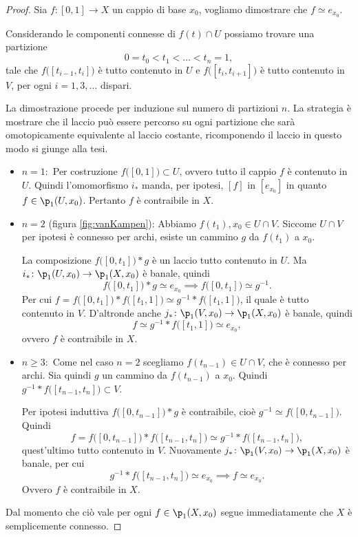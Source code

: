 \begin{proof}
	Sia \(f\colon [0,1] \to X\) un cappio di base \(x_0\), vogliamo dimostrare che \(f \simeq e_{x_0}\).

	Considerando le componenti connesse di \(f(t) \cap U\) possiamo trovare una partizione
	\[
		0 = t_0 < t_1 < \ldots < t_n=1,
	\]
	tale che \(f\big([t_{i-1},t_i]\big)\) è tutto contenuto in \(U\) e \(f\big([t_i,t_{i+1}]\big)\) è tutto contenuto in \(V\), per ogni \(i=1,3,\ldots\) dispari.

	La dimostrazione procede per induzione sul numero di partizioni \(n\).
	La strategia è mostrare che il laccio può essere percorso su ogni partizione che sarà omotopicamente equivalente al laccio costante, ricomponendo il laccio in questo modo si giunge alla tesi.
	\begin{itemize}
		\item \(n=1:\) Per costruzione \(f\big([0,1]\big)\subset U\), ovvero tutto il cappio \(f\) è contenuto in \(U\).
		      Quindi l'omomorfismo \(i_*\) manda, per ipotesi, \([f]\) in \([e_{x_0}]\) in quanto \(f\in \p_1(U,x_0)\).
		      Pertanto \(f\) è contraibile in \(X\).
		\item \(n=2\) (figura \ref{fig:vanKampen}): Abbiamo \(f(t_1),x_0\in U \cap V\).
		      Siccome \(U\cap V\) per ipotesi è connesso per archi, esiste un cammino \(g\) da \(f(t_1)\) a \(x_0\).

		      La composizione \(f\big([0,t_1]\big)*g\) è un laccio tutto contenuto in \(U\).
		      Ma \(i_*\colon \p_1(U,x_0) \to \p_1(X,x_0)\) è banale, quindi
		      \[
			      f\big([0,t_1]\big)*g \simeq e_{x_0} \implies f\big([0,t_1]\big) \simeq g^{-1}.
		      \]
		      Per cui \(f=f\big([0,t_1]\big)*f\big([t_1,1]\big)\simeq g^{-1}*f\big([t_1,1]\big)\), il quale è tutto contenuto in \(V\).
		      D'altronde anche \(j_*\colon \p_1(V,x_0)\to\p_1(X,x_0)\) è banale, quindi
		      \[
			      f \simeq g^{-1}*f\big([t_1,1]\big) \simeq e_{x_0},
		      \]
		      ovvero \(f\) è contraibile in \(X\).
		\item \(n\ge 3:\) Come nel caso \(n=2\) scegliamo \(f(t_{n-1})\in U\cap V\), che è connesso per archi.
		      Sia quindi \(g\) un cammino da \(f(t_{n-1})\) a \(x_0\).
		      Quindi \(g^{-1}*f\big([t_{n-1},t_n]\big)\subset V\).

		      Per ipotesi induttiva \(f\big([0,t_{n-1}]\big)*g\) è contraibile, cioè \(g^{-1} \simeq f\big([0,t_{n-1}]\big)\).
		      Quindi
		      \[
			      f = f\big([0,t_{n-1}]\big)*f\big([t_{n-1},t_n]\big) \simeq g^{-1}*f\big([t_{n-1},t_n]\big),
		      \]
		      quest'ultimo tutto contenuto in \(V\).
		      Nuovamente \(j_*\colon \p_1(V,x_0)\to\p_1(X,x_0)\) è banale, per cui
		      \[
			      g^{-1}*f\big([t_{n-1},t_n]\big) \simeq e_{x_0} \implies f \simeq e_{x_0}.
		      \]
		      Ovvero \(f\) è contraibile in \(X\).
	\end{itemize}
	Dal momento che ciò vale per ogni \(f\in \p_1(X,x_0)\) segue immediatamente che \(X\) è semplicemente connesso.
\end{proof}

